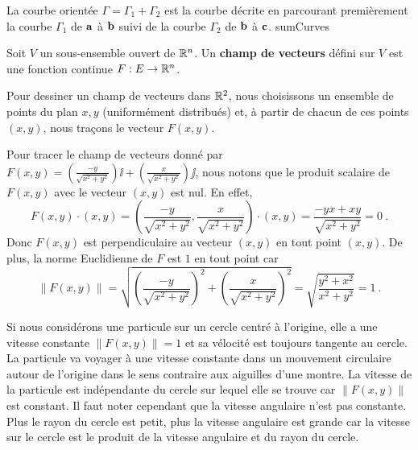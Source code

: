 {
{La courbe orientée $\Gamma = \Gamma_1 + \Gamma_2$ est la courbe
décrite en parcourant premièrement la courbe $\Gamma_1$ de $\mathbf{a}$ à
$\mathbf{b}$ suivi de la courbe $\Gamma_2$ de $\mathbf{b}$ à $\mathbf{c}$.}
{sumCurves}

\begin{defn} 
Soit $V$ un sous-ensemble ouvert de $\mathbb{R}^n$.  Un {\bfseries champ de vecteurs}
défini sur $V$ est une fonction continue $F:E \rightarrow \mathbb{R}^n$.
\end{defn}

Pour dessiner un champ de vecteurs dans $\mathbb{R}^2$, nous choisissons un
ensemble de points du plan $x,y$ (uniformément distribués) et, à partir
de chacun de ces points $(x,y)$, nous traçons le vecteur $F(x,y)$.

\begin{egg}
Pour tracer le champ de vecteurs donné par $\displaystyle
F(x,y) = \left( \frac{-y}{\sqrt{x^2+y^2}}\right) \ii +
\left( \frac{x}{\sqrt{x^2+y^2}}\right)\jj$, nous notons que le produit
scalaire de $F(x,y)$ avec le vecteur $(x,y)$ est nul.  En effet,
\[
  F(x,y) \cdot (x,y)
  = \left( \frac{-y}{\sqrt{x^2+y^2}}, \frac{x}{\sqrt{x^2+y^2}}\right)
  \cdot (x,y) = \frac{-yx + xy}{\sqrt{x^2+y^2}} = 0 \ .
\]
Donc $F(x,y)$ est perpendiculaire au vecteur $(x,y)$ en tout
point $(x,y)$.  De plus, la norme Euclidienne de $F$ est $1$ en
tout point car
\[
  \|F(x,y)\| =
  \sqrt{ \left( \frac{-y}{\sqrt{x^2+y^2}}\right)^2
    + \left(\frac{x}{\sqrt{x^2+y^2}}\right)^2}
  = \sqrt{\frac{y^2 + x^2}{x^2 + y^2}} = 1 \ .
\]


Si nous considérons une particule sur un cercle centré à l'origine, elle a
une vitesse constante $\|F(x,y)\| = 1$ et sa vélocité est
toujours tangente au cercle.  La particule va voyager à une vitesse
constante dans un mouvement circulaire autour de l'origine dans le
sens contraire aux aiguilles d'une montre.  La vitesse de la particule
est indépendante du cercle sur lequel elle se trouve car
$\|F(x,y)\|$ est constant.  Il faut noter cependant que la
vitesse angulaire n'est pas constante.  Plus le rayon du cercle est
petit, plus la vitesse angulaire est grande car la vitesse sur le
cercle est le produit de la vitesse angulaire et du rayon du cercle.
\end{egg}

}
